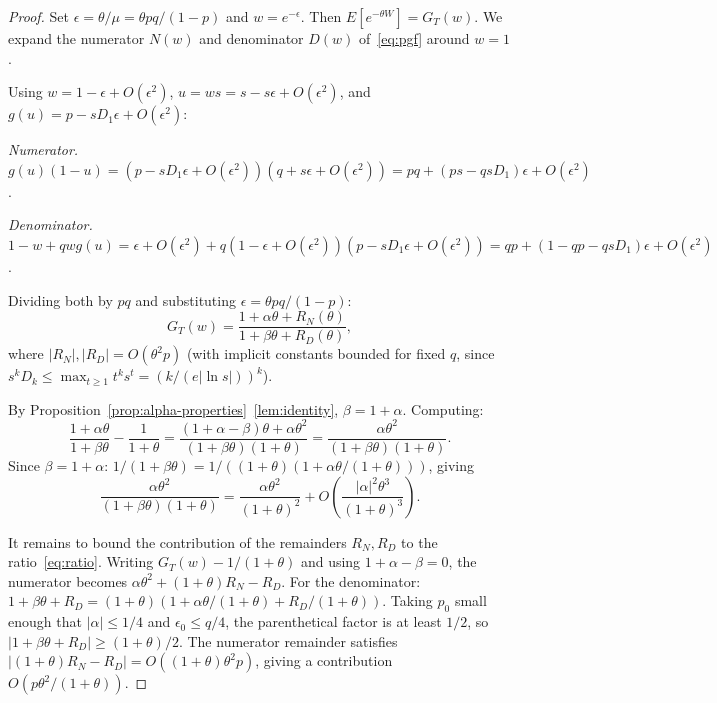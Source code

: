 \documentclass[11pt]{article}
\theoremstyle{plain}
\theoremstyle{definition}
\theoremstyle{remark}
\begin{document}
\begin{proof}
Set $\epsilon = \theta/\mu = \theta pq/(1-p)$ and $w = e^{-\epsilon}$.  Then $E[e^{-\theta W}] = G_T(w)$.  We expand the numerator $N(w)$ and denominator $D(w)$ of~\eqref{eq:pgf} around $w = 1$.

Using $w = 1 - \epsilon + O(\epsilon^2)$, $u = ws = s - s\epsilon + O(\epsilon^2)$, and $g(u) = p - sD_1\epsilon + O(\epsilon^2)$:

\emph{Numerator.}\; $g(u)(1-u) = (p - sD_1\epsilon + O(\epsilon^2))(q + s\epsilon + O(\epsilon^2)) = pq + (ps - qsD_1)\epsilon + O(\epsilon^2)$.

\emph{Denominator.}\; $1-w+qwg(u) = \epsilon + O(\epsilon^2) + q(1-\epsilon+O(\epsilon^2))(p-sD_1\epsilon+O(\epsilon^2)) = qp + (1-qp-qsD_1)\epsilon + O(\epsilon^2)$.

Dividing both by $pq$ and substituting $\epsilon = \theta pq/(1-p)$:
\begin{equation}\label{eq:ratio}
  G_T(w) = \frac{1 + \alpha\theta + R_N(\theta)}{1 + \beta\theta + R_D(\theta)},
\end{equation}
where $|R_N|, |R_D| = O(\theta^2 p)$ (with implicit constants bounded for fixed $q$, since $s^k D_k \leq \max_{t \geq 1} t^k s^t = (k/(e|\ln s|))^k$). %

By Proposition~\ref{prop:alpha-properties}~\eqref{lem:identity}, $\beta = 1 + \alpha$.  Computing:
\[
  \frac{1 + \alpha\theta}{1 + \beta\theta} - \frac{1}{1+\theta}
  = \frac{(1+\alpha-\beta)\theta + \alpha\theta^2}{(1+\beta\theta)(1+\theta)}
  = \frac{\alpha\theta^2}{(1+\beta\theta)(1+\theta)}.
\]
Since $\beta = 1 + \alpha$: $1/(1+\beta\theta) = 1/((1+\theta)(1 + \alpha\theta/(1+\theta)))$, giving
\[
  \frac{\alpha\theta^2}{(1+\beta\theta)(1+\theta)}
  = \frac{\alpha\theta^2}{(1+\theta)^2} + O\!\left(\frac{|\alpha|^2\theta^3}{(1+\theta)^3}\right).
\]

It remains to bound the contribution of the remainders $R_N, R_D$ to the ratio~\eqref{eq:ratio}.  Writing $G_T(w) - 1/(1+\theta)$ and using $1 + \alpha - \beta = 0$, the numerator becomes $\alpha\theta^2 + (1+\theta)R_N - R_D$.  For the denominator: $1 + \beta\theta + R_D = (1+\theta)(1 + \alpha\theta/(1+\theta) + R_D/(1+\theta))$.  Taking $p_0$ small enough that $|\alpha| \leq 1/4$ and $\epsilon_0 \leq q/4$, the parenthetical factor is at least $1/2$, so $|1+\beta\theta+R_D| \geq (1+\theta)/2$.  The numerator remainder satisfies $|(1+\theta)R_N - R_D| = O((1+\theta)\theta^2 p)$, giving a contribution $O(p\theta^2/(1+\theta))$.
\end{proof}
\end{document}
